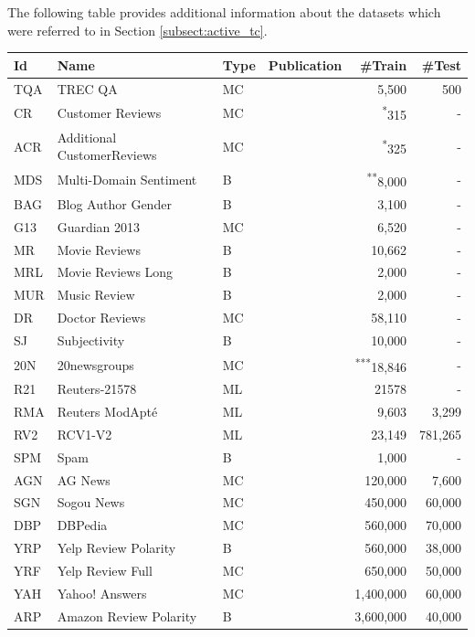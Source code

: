 The following table provides additional information about the datasets which were referred to in Section \ref{subsect:active_tc}. 
{
\setlength{\LTcapwidth}{\textwidth}
\begin{longtable}{l p{3.8cm} l p{4.1cm} r r}
  \hline
  \textbf{Id} & \textbf{Name} & \textbf{Type} & \textbf{Publication} & \textbf{\#Train} & \textbf{\#Test} \\
  \hline
  TQA & TREC QA & MC &  & 5,500 & 500 \\
  CR & Customer Reviews & MC &  & \textsuperscript{*}{315} & - \\
  ACR & Additional Customer\newline Reviews & MC &  & \textsuperscript{*}{325} & - \\
  MDS & Multi-Domain Sentiment & B &  & \textsuperscript{**}{8,000} & - \\
  BAG & Blog Author Gender & B &  & 3,100 & - \\
  G13 & Guardian 2013 & MC &  & 6,520 & -\\
  MR & Movie Reviews & B &  & 10,662 & - \\
  MRL & Movie Reviews Long & B &   & 2,000 & - \\
  MUR & Music Review & B &  & 2,000 & - \\
  DR & Doctor Reviews & MC &  & 58,110 & - \\
  SJ & Subjectivity & B &  & 10,000 & -\\
  20N & 20newsgroups & MC &  & \textsuperscript{***}18,846 & - \\
  R21 & Reuters-21578 & ML &  & 21578 & - \\
  RMA & Reuters ModApté & ML &  & 9,603 & 3,299\\
  RV2 & RCV1-V2 & ML &  & 23,149 & 781,265 \\
  SPM & Spam & B &  & 1,000 & - \\
  AGN & AG News & MC & \newline & 120,000 & 7,600 \\
  SGN & Sogou News & MC &  & 450,000 & 60,000\\
  DBP & DBPedia & MC &  & 560,000 & 70,000\\
  YRP & Yelp Review Polarity & B &  & 560,000 & 38,000\\
  YRF & Yelp Review Full & MC &  & 650,000 & 50,000\\
  YAH & Yahoo! Answers & MC &  & 1,400,000 & 60,000\\
  ARP & Amazon Review Polarity & B &  & 3,600,000 & 40,000\\

\end{longtable}}
